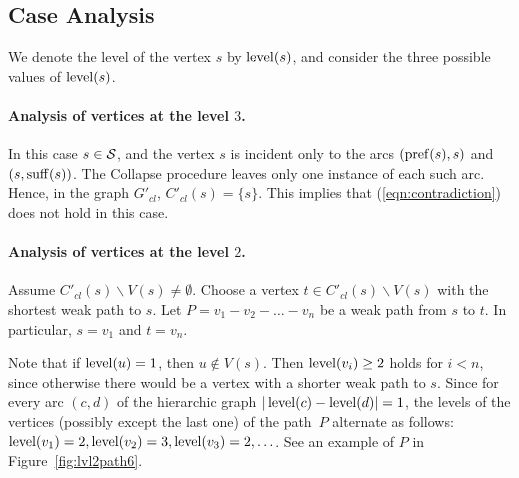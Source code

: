 \subsection{Case Analysis}
\label{sec:proof2}
We denote the level of the vertex $ s $ by $ \operatorname{level} (s) $, and consider the three possible values of $\operatorname{level}(s)$.


\paragraph{Analysis of vertices at the level \texorpdfstring{$3$}{3}.}

In this case $ s \in {\cal S} $, and the vertex $ s $ is incident only to the arcs $ (\operatorname{pref} (s), s)$ and $(s, \operatorname{suff} (s)) $. The Collapse procedure leaves only one instance of each such arc. Hence, in the graph $ G'_{cl} $, $ C'_{cl} (s) = \{s \} $. This implies that (\ref{eqn:contradiction}) does not hold in this case.

\paragraph{Analysis of vertices at the level \texorpdfstring{$2$}{2}.}

Assume $ C'_{cl} (s) \backslash V (s) \ne\emptyset$. Choose a vertex $ t\in C'_{cl} (s) \backslash V (s)$ with the shortest weak path to $s$. Let $P = v_1 - v_2 - \ldots - v_n $ be a weak path from $s$ to $t$. In particular, $s=v_1$ and $t=v_n$.

Note that if $ \operatorname{level} (u) = 1 $, then $ u \notin V (s) $. Then $ \operatorname{level} (v_i) \ge 2 $ holds for $ i<n $, since otherwise there would be a vertex with a shorter weak path to $s$. Since for every arc $(c,d)$ of the hierarchic graph $ | \operatorname{level} (c) - \operatorname{level} (d) | = 1 $,  the levels of the vertices (possibly except the last one) of the path~$P$ alternate as follows: $ \operatorname{level} (v_1) = 2, \operatorname{level} (v_2) = 3, \operatorname{level} (v_3) = 2,\ldots$. See an example of $P$ in Figure~\ref{fig:lvl2path6}.

